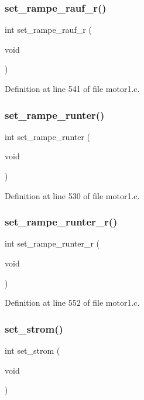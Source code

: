 \subsubsection{set\+\_\+rampe\+\_\+rauf\+\_\+r()}
{\footnotesize\ttfamily int set\+\_\+rampe\+\_\+rauf\+\_\+r (\begin{DoxyParamCaption}\item[{void}]{ }\end{DoxyParamCaption})}



Definition at line 541 of file motor1.\+c.

\mbox{\label{motor1_8c_a895f3882832612535da3e8d8bdfe9b1d}} 
\subsubsection{set\+\_\+rampe\+\_\+runter()}
{\footnotesize\ttfamily int set\+\_\+rampe\+\_\+runter (\begin{DoxyParamCaption}\item[{void}]{ }\end{DoxyParamCaption})}



Definition at line 530 of file motor1.\+c.

\mbox{\label{motor1_8c_a91a056e313c040cb3205fa0cf07608af}} 
\subsubsection{set\+\_\+rampe\+\_\+runter\+\_\+r()}
{\footnotesize\ttfamily int set\+\_\+rampe\+\_\+runter\+\_\+r (\begin{DoxyParamCaption}\item[{void}]{ }\end{DoxyParamCaption})}



Definition at line 552 of file motor1.\+c.

\mbox{\label{motor1_8c_a9e91f83fd7c44aa91e3eabd5b4ef536a}} 
\subsubsection{set\+\_\+strom()}
{\footnotesize\ttfamily int set\+\_\+strom (\begin{DoxyParamCaption}\item[{void}]{ }\end{DoxyParamCaption})}

